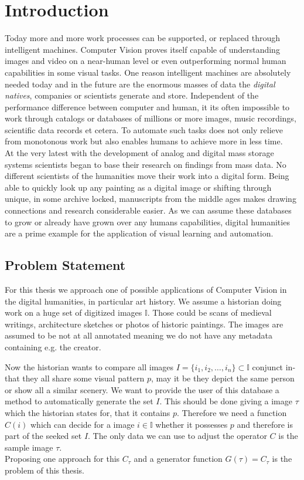 %
\chapter{Introduction}
\label{sec:intro}
Today more and more work processes can be supported, or replaced through intelligent machines. Computer Vision proves itself capable of understanding images and video on a near-human level or even outperforming normal human capabilities in some visual tasks. One reason intelligent machines are absolutely needed today and in the future are the enormous masses of data the \textit{digital natives}, companies or scientists generate and store. Independent of the performance difference between computer and human, it its often impossible to work through catalogs or databases of millions or more images, music recordings, scientific data records et cetera. To automate such tasks does not only relieve from monotonous work but also enables humans to achieve more in less time.\\
At the very latest with the development of analog and digital mass storage systems scientists began to base their research on findings from mass data. No different scientists of the humanities move their work into a digital form. Being able to quickly look up any painting as a digital image or shifting through unique, in some archive locked, manuscripts from the middle ages makes drawing connections and research considerable easier. As we can assume these databases to grow or already have grown over any humans capabilities, digital humanities are a prime example for the application of visual learning and automation.

\section{Problem Statement}
\label{sec:intro:motivation}
For this thesis we approach one of possible applications of Computer Vision in the digital humanities, in particular art history. We assume a historian doing work on a huge set of digitized images $\mathbb{I}$. Those could be scans of medieval writings, architecture sketches or photos of historic paintings. The images are assumed to be not at all annotated meaning we do not have any metadata containing e.g. the creator.

Now the historian wants to compare all images $I = \{i_1, i_2,\dotsc,i_n\} \subset \mathbb{I}$ conjunct in-that they all share some visual pattern $p$, may it be they depict the same person or show all a similar scenery. We want to provide the user of this database a method to automatically generate the set $I$. This should be done giving a image $\tau$ which the historian states for, that it contains $p$. Therefore we need a function $C(i)$ which can decide for a image $i\in\mathbb{I}$ whether it possesses $p$ and therefore is part of the seeked set $I$. The only data we can use to adjust the operator $C$ is the sample image $\tau$.\\Proposing one approach for this $C_\tau$ and a generator function $G(\tau) = C_\tau$ is the problem of this thesis.

